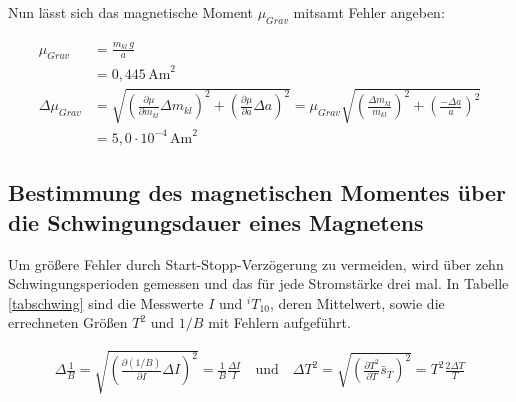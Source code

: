 Nun lässt sich das magnetische Moment $\mu_{Grav}$ mitsamt Fehler angeben:

\begin{align}
 \nonumber
 \mu_{Grav} &= \frac{m_{kl}\,g}{a} \\
 &= 0,445\, \text{Am}^2\\
 \nonumber
 \Delta \mu_{Grav} &= \sqrt{\left(\frac{\partial \mu}{\partial m_{kl}}\Delta m_{kl} \right)^2 + \left(\frac{\partial \mu}{\partial a}\Delta a \right)^2} = \mu_{Grav} \sqrt{\left( \frac{\Delta m_{kl}}{m_{kl}}\right)^2 + \left( \frac{-\Delta a}{a}\right)^2}\\
 &= 5,0 \cdot 10^{-4}\, \text{Am}^2
\end{align}

\subsection[Ermittlung durch Schwingungsdauer]{Bestimmung des magnetischen Momentes über die Schwingungsdauer eines Magnetens}
Um größere Fehler durch Start-Stopp-Verzögerung zu vermeiden, wird über zehn Schwingungsperioden gemessen und das für jede Stromstärke
drei mal. In Tabelle \ref{tabschwing} sind die Messwerte $I$ und $^iT_{10}$, deren Mittelwert, sowie die errechneten Größen $T^2$ und $1/B$
mit Fehlern aufgeführt.

\begin{align}
 \Delta \frac1B = \sqrt{\left(\frac{\partial (1/B)}{\partial I}\Delta I \right)^2} = \frac1B \frac{\Delta I}{I} \quad \text{und} \quad \Delta T^2 = \sqrt{\left(\frac{\partial T^2}{\partial T}\bar s_T\right)^2} = T^2\frac{2\Delta T}{T}
\end{align}


